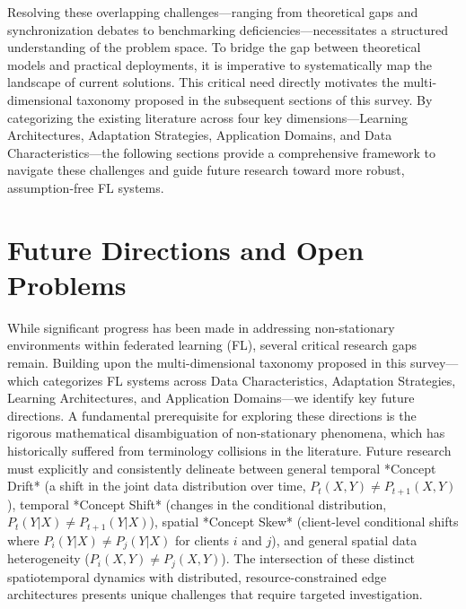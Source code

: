 \documentclass[journal]{IEEEtran}
\begin{document}
Resolving these overlapping challenges—ranging from theoretical gaps and synchronization debates to benchmarking deficiencies—necessitates a structured understanding of the problem space. To bridge the gap between theoretical models and practical deployments, it is imperative to systematically map the landscape of current solutions. This critical need directly motivates the multi-dimensional taxonomy proposed in the subsequent sections of this survey. By categorizing the existing literature across four key dimensions—Learning Architectures, Adaptation Strategies, Application Domains, and Data Characteristics—the following sections provide a comprehensive framework to navigate these challenges and guide future research toward more robust, assumption-free FL systems.

\section{Future Directions and Open Problems}
\label{sec:future_directions}

While significant progress has been made in addressing non-stationary environments within federated learning (FL), several critical research gaps remain. Building upon the multi-dimensional taxonomy proposed in this survey—which categorizes FL systems across Data Characteristics, Adaptation Strategies, Learning Architectures, and Application Domains—we identify key future directions. A fundamental prerequisite for exploring these directions is the rigorous mathematical disambiguation of non-stationary phenomena, which has historically suffered from terminology collisions in the literature. Future research must explicitly and consistently delineate between general temporal *Concept Drift* (a shift in the joint data distribution over time, $P_t(X, Y) \neq P_{t+1}(X, Y)$), temporal *Concept Shift* (changes in the conditional distribution, $P_t(Y|X) \neq P_{t+1}(Y|X)$), spatial *Concept Skew* (client-level conditional shifts where $P_i(Y|X) \neq P_j(Y|X)$ for clients $i$ and $j$), and general spatial data heterogeneity ($P_i(X, Y) \neq P_j(X, Y)$). The intersection of these distinct spatiotemporal dynamics with distributed, resource-constrained edge architectures presents unique challenges that require targeted investigation.
\end{document}
